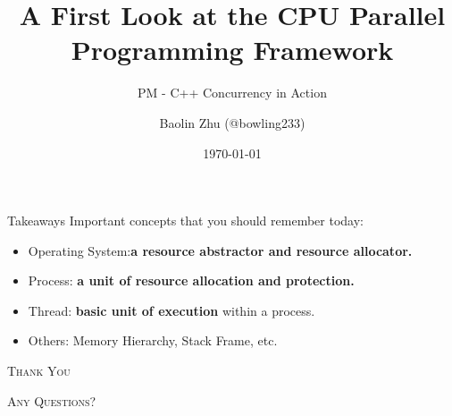 \documentclass{zjusct-beamer/zjusctbeamer}
\title{A First Look at the CPU Parallel Programming Framework}
\subtitle{PM - C++ Concurrency in Action}
\author[bowling233]{Baolin Zhu (@bowling233)}
\date{\today}
\institute[ZJUSCT]{Zhejiang University Supercomputing Team}
\begin{document}
\setmonofont{DejaVu Sans Mono}

\maketitle

\cutoc



\begin{frame}[fragile]{Takeaways}
	 Important concepts that you should remember today:
	\begin{itemize}
		\item Operating System:\textbf{a resource abstractor and resource allocator.}
		\item Process: \textbf{a unit of resource allocation and protection.}
		\item Thread: \textbf{basic unit of execution} within a process.
		\item Others: Memory Hierarchy, Stack Frame, etc.
	\end{itemize}
\end{frame}

\begin{frame}[standout]
	\Huge\textsc{Thank You}

	\vfill

	\LARGE\textsc{Any Questions?}
\end{frame}
\end{document}
